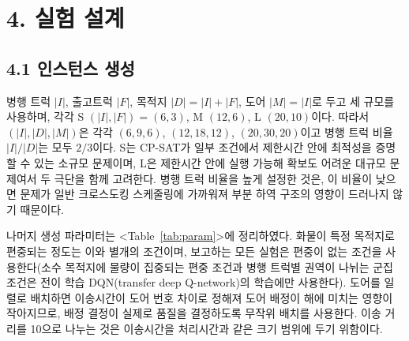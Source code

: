 \documentclass[10pt,a4paper]{article}
\begin{document}
\section{4. 실험 설계}

\subsection{4.1 인스턴스 생성}
병행 트럭 $|I|$, 출고트럭 $|F|$, 목적지 $|D|=|I|+|F|$, 도어 $|M|=|I|$로 두고 세 규모를 사용하며, 각각 S $(|I|,|F|)=(6,3)$, M $(12,6)$, L $(20,10)$이다. 따라서 $(|I|,|D|,|M|)$은 각각
$(6,9,6)$, $(12,18,12)$, $(20,30,20)$이고 병행 트럭 비율 $|I|/|D|$는 모두 $2/3$이다. S는
CP-SAT가 일부 조건에서 제한시간 안에 최적성을 증명할 수 있는 소규모 문제이며, L은 제한시간 안에
실행 가능해 확보도 어려운 대규모 문제여서 두 극단을 함께 고려한다. 병행 트럭 비율을 높게 설정한 것은, 이 비율이 낮으면 문제가
일반 크로스도킹 스케줄링에 가까워져 부분 하역 구조의 영향이 드러나지 않기 때문이다.

나머지 생성 파라미터는 <Table~\ref{tab:param}>에 정리하였다. 화물이 특정 목적지로 편중되는 정도는 이와 별개의 조건이며, 보고하는 모든 실험은 편중이 없는 조건을 사용한다(소수 목적지에
물량이 집중되는 편중 조건과 병행 트럭별 권역이 나뉘는 군집 조건은 전이 학습 DQN(transfer deep Q-network)의 학습에만 사용한다). 도어를 일렬로 배치하면
이송시간이 도어 번호 차이로 정해져 도어 배정이 해에 미치는 영향이 작아지므로, 배정
결정이 실제로 품질을 결정하도록 무작위 배치를 사용한다. 이송 거리를 10으로 나누는 것은
이송시간을 처리시간과 같은 크기 범위에 두기 위함이다.
\end{document}
